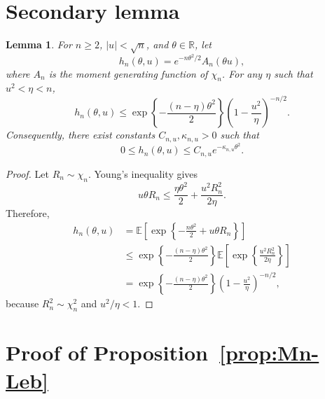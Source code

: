 \documentclass{article}
\newtheorem{lemma}{Lemma}
\begin{document}




\appendix

\section{Secondary lemma}
\label{app:lemma}

\begin{lemma}
\label{lemma:hthetabound}
For \(n\geq2\), \(|u|<\sqrt n\), and \(\theta\in\mathbb R\), let
\begin{equation}
\label{eq:hthetadef2}
  h_n(\theta,u)
  =
  e^{-n\theta^2/2}A_n(\theta u),
\end{equation}
where \(A_n\) is the moment generating function of \(\chi_n\). For any
\(\eta\) such that \(u^2<\eta<n\),
\begin{equation}
\label{eq:hu-env}
  h_n(\theta,u)
  \leq
  \exp\left\{-\frac{(n-\eta)\theta^2}{2}\right\}
  \left(1-\frac{u^2}{\eta}\right)^{-n/2}.
\end{equation}
Consequently, there exist constants \(C_{n,u},\kappa_{n,u}>0\) such
that
\[
  0\leq h_n(\theta,u)
  \leq C_{n,u}e^{-\kappa_{n,u}\theta^2}.
\]
\end{lemma}

\begin{proof}
Let \(R_n\sim\chi_n\). Young's inequality gives
\[
  u\theta R_n
  \leq
  \frac{\eta\theta^2}{2}
  +
  \frac{u^2R_n^2}{2\eta}.
\]
Therefore,
\begin{align*}
  h_n(\theta,u)
  &=
  \mathbb E\left[
    \exp\left\{-\frac{n\theta^2}{2}+u\theta R_n\right\}
  \right]
  \\
  &\leq
  \exp\left\{-\frac{(n-\eta)\theta^2}{2}\right\}
  \mathbb E\left[
    \exp\left\{\frac{u^2R_n^2}{2\eta}\right\}
  \right]
  \\
  &=
  \exp\left\{-\frac{(n-\eta)\theta^2}{2}\right\}
  \left(1-\frac{u^2}{\eta}\right)^{-n/2},
\end{align*}
because \(R_n^2\sim\chi_n^2\) and \(u^2/\eta<1\).
\end{proof}

\section{Proof of Proposition~\ref{prop:Mn-Leb}}
\label{app:proof-Leb}
\end{document}
